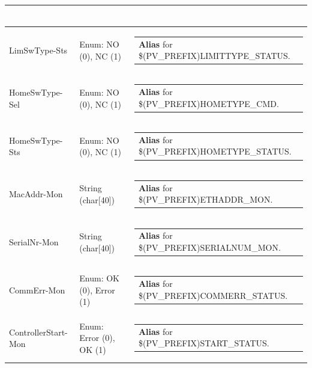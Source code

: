 \documentclass[openany]{article}
\begin{document}
\begin{longtable}{| m{4.5cm} m{2.5cm}  m{8.5cm} |}
\begin{tabular}{@{}m{6cm}@{}}
            \end{tabular} \hypertarget{}{}\\ \hline
        LimSwType-Sts & Enum: NO (0), NC (1) & \begin{tabular}{@{}m{6cm}@{}}
                \textbf{\color{blue} Alias} for \$(PV\_PREFIX)LIMITTYPE\_STATUS.
            \end{tabular} \hypertarget{pv:home-sw-type}{}\\ \hline
        HomeSwType-Sel & Enum: NO (0), NC (1) & \begin{tabular}{@{}m{6cm}@{}}
                \textbf{\color{blue} Alias} for \$(PV\_PREFIX)HOMETYPE\_CMD.
            \end{tabular} \hypertarget{}{}\\ \hline
        HomeSwType-Sts & Enum: NO (0), NC (1) & \begin{tabular}{@{}m{6cm}@{}}
                \textbf{\color{blue} Alias} for \$(PV\_PREFIX)HOMETYPE\_STATUS.
            \end{tabular} \hypertarget{pv:mac-addr-mon}{}\\ \hline
        MacAddr-Mon & String (char[40]) & \begin{tabular}{@{}m{6cm}@{}}
                \textbf{\color{blue} Alias} for \$(PV\_PREFIX)ETHADDR\_MON.
            \end{tabular} \hypertarget{pv:serial-nr-mon}{}\\ \hline
        SerialNr-Mon & String (char[40]) & \begin{tabular}{@{}m{6cm}@{}}
                \textbf{\color{blue} Alias} for \$(PV\_PREFIX)SERIALNUM\_MON.
            \end{tabular} \hypertarget{pv:comm-err-mon}{}\\ \hline
        CommErr-Mon & Enum: OK (0), Error (1) & \begin{tabular}{@{}m{6cm}@{}}
                \textbf{\color{blue} Alias} for \$(PV\_PREFIX)COMMERR\_STATUS.
            \end{tabular} \hypertarget{pv:controller-start-mon}{}\\ \hline
        ControllerStart-Mon & Enum: Error (0), OK (1)  & \begin{tabular}{@{}m{6cm}@{}}
                \textbf{\color{blue} Alias} for \$(PV\_PREFIX)START\_STATUS.
            \end{tabular} \hypertarget{pv:deferred-move}{}\\ \hline

\end{longtable}
\end{document}
